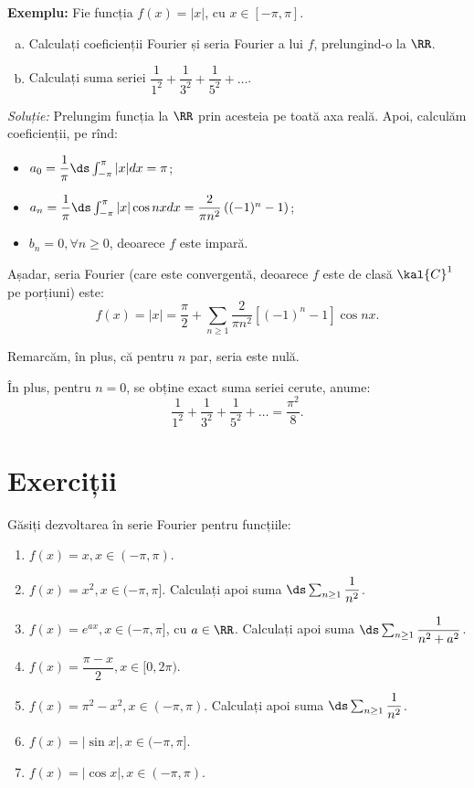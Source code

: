 \vspace{0.3cm}

\textbf{Exemplu:} Fie funcția $ f(x) = |x| $, cu $ x \in [-\pi, \pi] $.
\begin{enumerate}[(a)]
    \item Calculați coeficienții Fourier și seria Fourier a lui $ f $, prelungind-o la $ \RR $.
    \item Calculați suma seriei $ \dfrac{1}{1^2} + \dfrac{1}{3^2} + \dfrac{1}{5^2} + \dots $.
\end{enumerate}

\emph{Soluție:} Prelungim funcția la $ \RR $ prin  acesteia pe toată axa reală.
Apoi, calculăm coeficienții, pe rînd:
\begin{itemize}
    \item $ a_0 = \dfrac{1}{\pi} \ds\int_{-\pi}^{\pi} |x| dx = \pi $;
    \item $ a_n = \dfrac{1}{\pi} \ds\int_{-\pi}^{\pi} |x| \cos nx dx = \dfrac{2}{\pi n^2} \left( (-1)^n - 1 \right) $;
    \item $ b_n = 0, \forall n \geq 0 $, deoarece $ f $ este impară.
\end{itemize}

Așadar, seria Fourier (care este convergentă, deoarece $ f $ este de clasă $ \kal{C}^1 $ pe porțiuni) este:
\[
    f(x) = |x| = \dfrac{\pi}{2} + \sum_{n \geq 1} \dfrac{2}{\pi n^2} \left[ (-1)^n - 1 \right] \cos nx.
\]

Remarcăm, în plus, că pentru $ n $ par, seria este nulă.

În plus, pentru $ n = 0 $, se obține exact suma seriei cerute, anume:
\[
    \dfrac{1}{1^2} + \dfrac{1}{3^2} + \dfrac{1}{5^2} + \dots = \dfrac{\pi^2}{8}.
\]




\section{Exerciții}

Găsiți dezvoltarea în serie Fourier pentru funcțiile: %
\begin{enumerate}[(1)]
    \item $ f(x) = x, x \in (-\pi, \pi) $.
    \item $ f(x) = x^2, x \in (-\pi, \pi] $. Calculați apoi suma $ \ds\sum_{n \geq 1} \dfrac{1}{n^2} $.
    \item $ f(x) = e^{ax}, x \in (-\pi, \pi] $, cu $ a \in \RR $. Calculați apoi suma $ \ds\sum_{n \geq 1} \dfrac{1}{n^2 + a^2} $.
    \item $ f(x) = \dfrac{\pi - x}{2}, x \in [0, 2\pi) $.
    \item $ f(x) = \pi^2 - x^2, x \in (-\pi, \pi ) $. Calculați apoi suma $ \ds\sum_{n \geq 1} \dfrac{1}{n^2} $.
    \item $ f(x) = | \sin x |, x \in (-\pi, \pi] $.
    \item $ f(x) = | \cos x |, x \in (-\pi, \pi) $.
\end{enumerate}